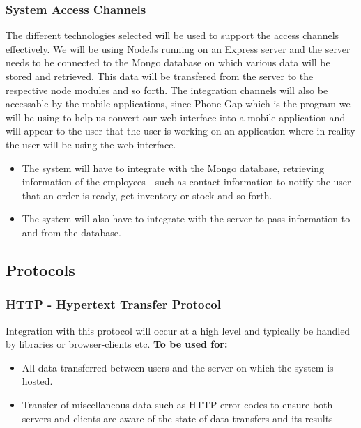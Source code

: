 \documentclass[12pt]{article}
\begin{document}
\subsubsection{System Access Channels}
The different technologies selected will be used to support the access channels effectively. We will be using NodeJs running on an Express server and the server needs to be connected to the Mongo database on which various data will be stored and retrieved. This data will be transfered from the server to the respective node modules and so forth. 
The integration channels will also be accessable by the mobile applications, since Phone Gap which is the program we will be using to help us convert our web interface into a mobile application and will appear to the user that the user is working on an application where in reality the user will be using the web interface. 

\begin{itemize}

\item The system will have to integrate with the Mongo database, retrieving information of the employees - such as contact information to notify the user that an order is ready, get inventory or stock and so forth. 

\item The system will also have to integrate with the server to pass information to and from the database.
\end{itemize}

\subsection{Protocols}
\subsubsection{HTTP - Hypertext Transfer Protocol}
Integration with this protocol will occur at a high level and typically be handled by libraries or browser-clients etc.
\textbf{To be used for:	}
	\begin{itemize}
	\item{All data transferred between users and the server on which the system is hosted.}
	\item{Transfer of miscellaneous data such as HTTP error codes to ensure both servers and clients are aware of the state of data transfers and its results}
	\end{itemize}
	
\end{document}

